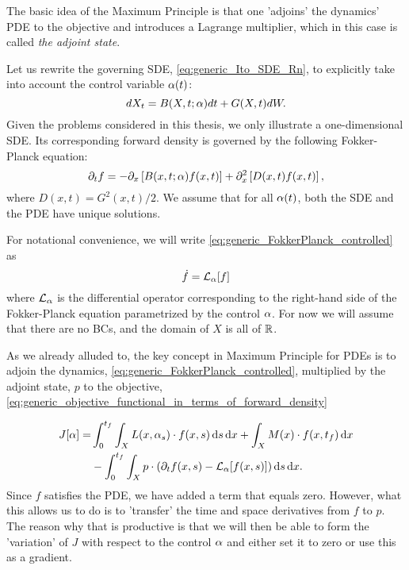 The basic idea of the Maximum Principle is that one 'adjoins' the dynamics' PDE
to the objective and introduces a Lagrange multiplier, which in this case is
called {\sl the adjoint state}.

Let us rewrite the governing SDE, \cref{eq:generic_Ito_SDE_Rn}, to explicitly
take into account the control variable $\alpha(t)$:
\begin{equation}
dX_t = B(X,t; \alpha) dt + G(X,t) dW.
\label{eq:generic_Ito_SDE_Rn_controlled}
\end{equation} 
Given the problems considered in this thesis, we only
illustrate  a one-dimensional SDE. Its corresponding forward density is
governed by the following Fokker-Planck equation: 
\begin{equation}
{\partial}_t {f}= -{\partial}_{x } \left[ B (x,t;\alpha) {f}(x,t) \right] +  
{\partial}^2_{x} \left[ D(x,t) {f}(x,t) \right],
\label{eq:generic_FokkerPlanck_controlled}
\end{equation} 
where $D(x,t) = G^2(x,t)/2$. We assume that for all $\alpha(t)$, both the SDE and the
PDE have unique solutions. 

For notational convenience, we will write
\cref{eq:generic_FokkerPlanck_controlled} as
$$ \dot{{f}} = { \mathcal{L} }_{\alpha} [{f}] $$ where ${ \mathcal{L} }_{\alpha}$ is the differential operator corresponding to the
right-hand side of the Fokker-Planck equation parametrized by the control $\alpha$.
For now we will assume that there are no BCs, and the domain of $X$ is all of ${ \mathbb{R} }$.

As we already alluded to, the key concept in Maximum Principle for PDEs is to
adjoin the dynamics, \cref{eq:generic_FokkerPlanck_controlled}, multiplied by
the adjoint state, $p$ to the objective,
\cref{eq:generic_objective_functional_in_terms_of_forward_density}
  
\begin{align*}
J[\alpha] =& \int_0^{ t_f }\int_X L(x, \alpha_s) \cdot f(x,s) \, \mathrm{d} s\, \mathrm{d} x 
+ \int_X  M(x)\cdot f(x,{ t_f }) \, \mathrm{d} x
\\ &- \int_0^{ t_f }\int_X p \cdot ({\partial}_t f(x,s)  - { \mathcal{L} }_{\alpha} [f(x,s)] )
\, \mathrm{d} s\, \mathrm{d} x. 
\end{align*}
Since $f$ satisfies the PDE, we have added a term that equals zero. 
However, what this allows us to do is to 'transfer' the time and space
derivatives from $f$ to $p$. The reason why
that is productive is that we will then be able to form the 'variation'
of $J$ with respect to the control $\alpha$ and either set it to zero or use this as
a gradient. 

